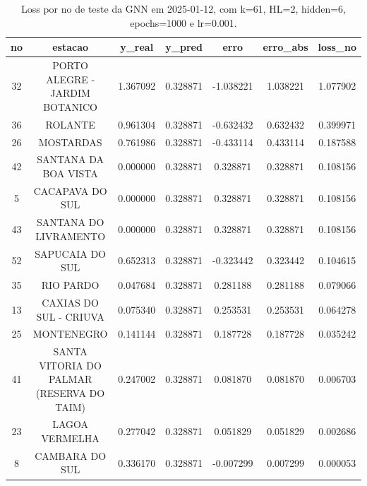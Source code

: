 \begin{table}[h]
\centering
\caption{Loss por no de teste da GNN em 2025-01-12, com k=61, HL=2, hidden=6, epochs=1000 e lr=0.001.}
\label{tab:gnn_loss_k61_hl2_h6_e1000_d20250112}
\begin{tabular}{ccccccc}
\toprule
no & estacao & y\_real & y\_pred & erro & erro\_abs & loss\_no \\
\midrule
32 & PORTO ALEGRE - JARDIM BOTANICO & 1.367092 & 0.328871 & -1.038221 & 1.038221 & 1.077902 \\
36 & ROLANTE & 0.961304 & 0.328871 & -0.632432 & 0.632432 & 0.399971 \\
26 & MOSTARDAS & 0.761986 & 0.328871 & -0.433114 & 0.433114 & 0.187588 \\
42 & SANTANA DA BOA VISTA & 0.000000 & 0.328871 & 0.328871 & 0.328871 & 0.108156 \\
5 & CACAPAVA DO SUL & 0.000000 & 0.328871 & 0.328871 & 0.328871 & 0.108156 \\
43 & SANTANA DO LIVRAMENTO & 0.000000 & 0.328871 & 0.328871 & 0.328871 & 0.108156 \\
52 & SAPUCAIA DO SUL & 0.652313 & 0.328871 & -0.323442 & 0.323442 & 0.104615 \\
35 & RIO PARDO & 0.047684 & 0.328871 & 0.281188 & 0.281188 & 0.079066 \\
13 & CAXIAS DO SUL - CRIUVA & 0.075340 & 0.328871 & 0.253531 & 0.253531 & 0.064278 \\
25 & MONTENEGRO & 0.141144 & 0.328871 & 0.187728 & 0.187728 & 0.035242 \\
41 & SANTA VITORIA DO PALMAR (RESERVA DO TAIM) & 0.247002 & 0.328871 & 0.081870 & 0.081870 & 0.006703 \\
23 & LAGOA VERMELHA & 0.277042 & 0.328871 & 0.051829 & 0.051829 & 0.002686 \\
8 & CAMBARA DO SUL & 0.336170 & 0.328871 & -0.007299 & 0.007299 & 0.000053 \\
\bottomrule
\end{tabular}
\end{table}
